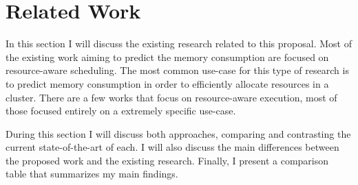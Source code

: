 \section{Related Work}
\label{sec:related-work}

In this section I will discuss the existing research related to this proposal.
Most of the existing work aiming to predict the memory consumption are focused on resource-aware scheduling.
The most common use-case for this type of research is to predict memory consumption in order to efficiently allocate resources in a cluster.
There are a few works that focus on resource-aware execution, most of those focused entirely on a extremely specific use-case.

During this section I will discuss both approaches, comparing and contrasting the current state-of-the-art of each.
I will also discuss the main differences between the proposed work and the existing research.
Finally, I present a comparison table that summarizes my main findings.




